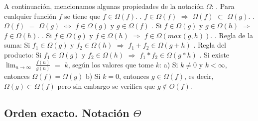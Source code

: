 \documentclass[10pt,a4paper]{article}
\begin{document}
A continuación, mencionamos algunas propiedades de la notación $\Omega$:
\newline
{}. Para cualquier función $f$ se tiene que $f \in \Omega(f)$.
\newline
{}. $f \in \Omega(f)$ $\Rightarrow$ $\Omega(f)$ $\subset$ $\Omega(g)$. 
\newline
{}. $\Omega(f)$ $=$ $\Omega(g)$ $\Leftrightarrow$ $f \in \Omega(g)$ y $g \in \Omega(f)$
\newline
{}. Si $f \in \Omega(g)$ y $g \in \Omega(h)$ $\Rightarrow$ $f \in \Omega(h)$.
\newline
{}. Si $f \in \Omega(g)$ y $f \in \Omega(h)$ $\Rightarrow$ $f \in \Omega(max(g,h))$. 
\newline
{}. Regla de la suma: Si $f_{1} \in \Omega(g)$ y $f_{2} \in \Omega(h)$ $\Rightarrow$ $f_{1} + f_{2} \in \Omega(g + h)$   
\newline
{}. Regla del producto: Si $f_{1} \in \Omega(g)$ y $f_{2} \in \Omega(h)$ $\Rightarrow$ $f_{1} * f_{2} \in \Omega(g * h)$ 
\newline
{}. Si existe $\displaystyle \lim_{n \to \infty}$ $\displaystyle \frac{f(n)}{g(n)}$ $=$ $k$, según los valores que tome $k$:
\newline
\newline
a) Si $k \neq 0$ y $k < \infty$, entonces $\Omega(f) = \Omega(g)$  
\newline
\newline
b) Si $k = 0$, entonces $g \in \Omega(f)$, es decir, $\Omega(g) \subset \Omega(f)$ pero sin embargo se verifica que $g \notin O(f)$. 

\subsection{Orden exacto. Notación $\Theta$}
\end{document}
